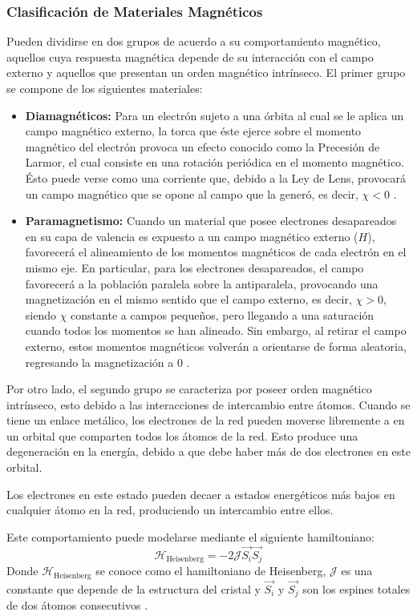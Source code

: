 \documentclass[../main.tex]{subfiles}
\begin{document}
\subsubsection{Clasificación de Materiales Magnéticos}
Pueden dividirse en dos grupos de acuerdo a su comportamiento magnético, aquellos cuya respuesta magnética depende de su interacción con el campo externo y aquellos que presentan un orden magnético intrínseco. El primer grupo se compone de los siguientes materiales:
\begin{itemize}
    \item \textbf{Diamagnéticos:} Para un electrón sujeto a una órbita al cual se le aplica un campo magnético externo, la torca que éste ejerce sobre el momento magnético del electrón provoca un efecto conocido como la Precesión de Larmor, el cual consiste en una rotación periódica en el momento magnético. Ésto puede verse como una corriente que, debido a la Ley de Lens, provocará un campo magnético que se opone al campo que la generó, es decir, $\chi<0$ \cite{coey2010magnetism}.
    \item \textbf{Paramagnetismo:} Cuando un material que posee electrones desapareados en su capa de valencia es expuesto a un campo magnético externo ($H$), favorecerá el alineamiento de los momentos magnéticos de cada electrón en el mismo eje. En particular, para los electrones desapareados, el campo favorecerá a la población paralela sobre la antiparalela, provocando una magnetización en el mismo sentido que el campo externo, es decir, $\chi>0$, siendo $\chi$ constante a campos pequeños, pero llegando a una saturación cuando todos los momentos se han alineado. Sin embargo, al retirar el campo externo, estos momentos magnéticos volverán a orientarse de forma aleatoria, regresando la magnetización a 0 \cite{coey2010magnetism}.
\end{itemize}
Por otro lado, el segundo grupo se caracteriza por poseer orden magnético intrínseco, esto debido a las interacciones de intercambio entre átomos. Cuando se tiene un enlace metálico, los electrones de la red pueden moverse libremente a en un orbital que comparten todos los átomos de la red. Esto produce una degeneración en la energía, debido a que debe haber más de dos electrones en este orbital.

Los electrones en este estado pueden decaer a estados energéticos más bajos en cualquier átomo en la red, produciendo un intercambio entre ellos.

Este comportamiento puede modelarse mediante el siguiente hamiltoniano:
\begin{equation}
    \mathcal{H}_{\text{Heisenberg}}=-2\mathcal{J}\vec{S_i}\vec{S_j}
    \label{eq:heisenberginterc}
\end{equation}
Donde $\mathcal{H}_{\text{Heisenberg}}$ se conoce como el hamiltoniano de Heisenberg, $\mathcal{J}$ es una constante que depende de la estructura del cristal y $\vec{S_i}$ y $\vec{S_j}$ son los espines totales de dos átomos consecutivos \cite{coey2010magnetism}.
\end{document}
